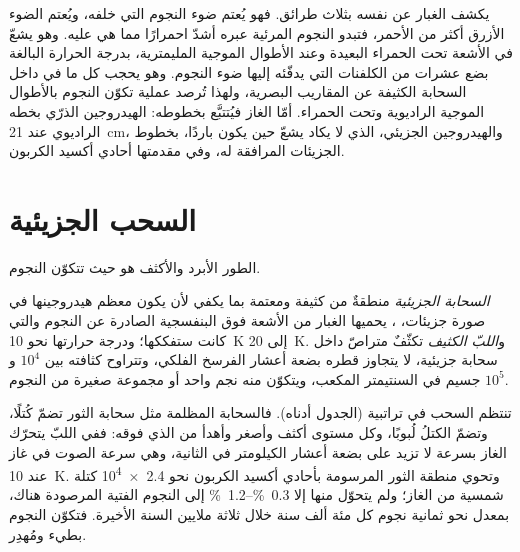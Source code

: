 يكشف الغبار عن نفسه بثلاث طرائق. فهو يُعتم ضوء النجوم التي خلفه،
ويُعتم الضوء الأزرق أكثر من الأحمر، فتبدو النجوم المرئية عبره أشدّ احمرارًا
مما هي عليه. وهو يشعّ في الأشعة تحت الحمراء البعيدة وعند الأطوال الموجية المليمترية،
بدرجة الحرارة البالغة بضع عشرات من الكلفنات التي يدفّئه إليها ضوء النجوم. وهو
يحجب كل ما في داخل السحابة الكثيفة عن المقاريب البصرية، ولهذا
تُرصد عملية تكوّن النجوم بالأطوال الموجية الراديوية وتحت الحمراء. أمّا الغاز
فيُتتبَّع بخطوطه: الهيدروجين الذرّي بخطه الراديوي عند \qty{21}{cm}،
والهيدروجين الجزيئي، الذي لا يكاد يشعّ حين يكون باردًا، بخطوط
الجزيئات المرافقة له، وفي مقدمتها أحادي أكسيد الكربون.

\section{السحب الجزيئية}

الطور الأبرد والأكثف هو حيث تتكوّن النجوم.

\begin{definition}
\label{def:b2:ism-star-formation:molecular-cloud}
\emph{السحابة الجزيئية} منطقةٌ من
 كثيفة ومعتمة بما يكفي لأن يكون معظم هيدروجينها في صورة
جزيئات، ، يحميها الغبار من الأشعة فوق البنفسجية الصادرة عن النجوم
والتي كانت ستفككها؛ ودرجة حرارتها نحو \qty{10}{K} إلى \qty{20}{K}.
و\emph{اللبّ الكثيف} تكثّفٌ متراصّ داخل
سحابة جزيئية، لا يتجاوز قطره بضعة أعشار الفرسخ الفلكي، وتتراوح كثافته بين
$10^4$ و$10^5$ جسيم في السنتيمتر المكعب، ويتكوّن منه نجم واحد أو
مجموعة صغيرة من النجوم.
\end{definition}

تنتظم السحب في تراتبية (الجدول أدناه). فالسحابة المظلمة مثل سحابة الثور
تضمّ كُتلًا، وتضمّ الكتلُ لُبوبًا، وكل مستوى أكثف وأصغر وأهدأ
من الذي فوقه: ففي اللبّ يتحرّك الغاز بسرعة لا تزيد على بضعة أعشار
الكيلومتر في الثانية، وهي سرعة الصوت في غاز عند \qty{10}{K}. وتحوي
منطقة الثور المرسومة بأحادي أكسيد الكربون نحو \num{2.4e4} كتلة شمسية
من الغاز؛ ولم يتحوّل منها إلا \qtyrange{0.3}{1.2}{\percent} إلى
النجوم الفتية المرصودة هناك، بمعدل نحو ثمانية نجوم كل مئة ألف
سنة خلال ثلاثة ملايين السنة الأخيرة. فتكوّن النجوم بطيء ومُهدِر.

